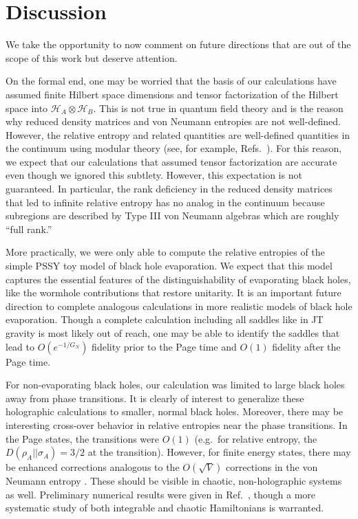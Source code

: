 \documentclass[a4paper,11pt]{article}
\begin{document}
\section{Discussion}


We take the opportunity to now comment on future directions that are out of the scope of this work but deserve attention.

On the formal end, one may be worried that the basis of our calculations have assumed finite Hilbert space dimensions and tensor factorization of the Hilbert space into $\mathcal{H}_A \otimes \mathcal{H}_B$. This is not true in quantum field theory and is the reason why reduced density matrices and von Neumann entropies are not well-defined. However, the relative entropy and related quantities are well-defined quantities in the continuum using modular theory (see, for example, Refs.~\cite{2017arXiv170204924H, 2018arXiv180304993W}). 
For this reason, we expect that our calculations that assumed tensor factorization are accurate even though we ignored this subtlety. However, this expectation is not guaranteed. In particular, the rank deficiency in the reduced density matrices that led to infinite relative entropy has no analog in the continuum because subregions are described by Type III von Neumann algebras which are roughly ``full rank.''

More practically, we were only able to compute the relative entropies of the simple PSSY toy model of black hole evaporation. We expect that this model captures the essential features of the distinguishability of evaporating black holes, like the wormhole contributions that restore unitarity. It is an important future direction to complete analogous calculations in more realistic models of black hole evaporation. Though a complete calculation including all saddles like in JT gravity is most likely out of reach, one may be able to identify the saddles that lead to $O(e^{-1/G_N})$ fidelity prior to the Page time and $O(1)$ fidelity after the Page time.

For non-evaporating black holes, our calculation was limited to large black holes away from phase transitions. It is clearly of interest to generalize these holographic calculations to smaller, normal black holes. Moreover, there may be interesting cross-over behavior in relative entropies near the phase transitions. In the Page states, the transitions were $O(1)$ (e.g.~for relative entropy, the $D(\rho_A || \sigma_A) = 3/2$ at the transition). However, for finite energy states, there may be enhanced corrections analogous to the $O(\sqrt{V})$ corrections in the von Neumann entropy \cite{2017PhRvL.119v0603V,2019PhRvE.100b2131M,2020JHEP...11..007D,2020JHEP...12..084M}. These should be visible in chaotic, non-holographic systems as well. Preliminary numerical results were given in Ref.~\cite{2021PhRvL.126q1603K}, though a more systematic study of both integrable and chaotic Hamiltonians is warranted.
\end{document}
